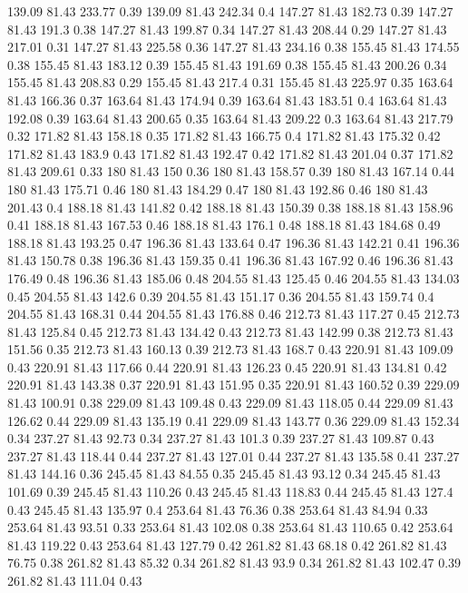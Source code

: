 139.09	81.43	233.77	0.39
139.09	81.43	242.34	0.4
147.27	81.43	182.73	0.39
147.27	81.43	191.3	0.38
147.27	81.43	199.87	0.34
147.27	81.43	208.44	0.29
147.27	81.43	217.01	0.31
147.27	81.43	225.58	0.36
147.27	81.43	234.16	0.38
155.45	81.43	174.55	0.38
155.45	81.43	183.12	0.39
155.45	81.43	191.69	0.38
155.45	81.43	200.26	0.34
155.45	81.43	208.83	0.29
155.45	81.43	217.4	0.31
155.45	81.43	225.97	0.35
163.64	81.43	166.36	0.37
163.64	81.43	174.94	0.39
163.64	81.43	183.51	0.4
163.64	81.43	192.08	0.39
163.64	81.43	200.65	0.35
163.64	81.43	209.22	0.3
163.64	81.43	217.79	0.32
171.82	81.43	158.18	0.35
171.82	81.43	166.75	0.4
171.82	81.43	175.32	0.42
171.82	81.43	183.9	0.43
171.82	81.43	192.47	0.42
171.82	81.43	201.04	0.37
171.82	81.43	209.61	0.33
180	81.43	150	0.36
180	81.43	158.57	0.39
180	81.43	167.14	0.44
180	81.43	175.71	0.46
180	81.43	184.29	0.47
180	81.43	192.86	0.46
180	81.43	201.43	0.4
188.18	81.43	141.82	0.42
188.18	81.43	150.39	0.38
188.18	81.43	158.96	0.41
188.18	81.43	167.53	0.46
188.18	81.43	176.1	0.48
188.18	81.43	184.68	0.49
188.18	81.43	193.25	0.47
196.36	81.43	133.64	0.47
196.36	81.43	142.21	0.41
196.36	81.43	150.78	0.38
196.36	81.43	159.35	0.41
196.36	81.43	167.92	0.46
196.36	81.43	176.49	0.48
196.36	81.43	185.06	0.48
204.55	81.43	125.45	0.46
204.55	81.43	134.03	0.45
204.55	81.43	142.6	0.39
204.55	81.43	151.17	0.36
204.55	81.43	159.74	0.4
204.55	81.43	168.31	0.44
204.55	81.43	176.88	0.46
212.73	81.43	117.27	0.45
212.73	81.43	125.84	0.45
212.73	81.43	134.42	0.43
212.73	81.43	142.99	0.38
212.73	81.43	151.56	0.35
212.73	81.43	160.13	0.39
212.73	81.43	168.7	0.43
220.91	81.43	109.09	0.43
220.91	81.43	117.66	0.44
220.91	81.43	126.23	0.45
220.91	81.43	134.81	0.42
220.91	81.43	143.38	0.37
220.91	81.43	151.95	0.35
220.91	81.43	160.52	0.39
229.09	81.43	100.91	0.38
229.09	81.43	109.48	0.43
229.09	81.43	118.05	0.44
229.09	81.43	126.62	0.44
229.09	81.43	135.19	0.41
229.09	81.43	143.77	0.36
229.09	81.43	152.34	0.34
237.27	81.43	92.73	0.34
237.27	81.43	101.3	0.39
237.27	81.43	109.87	0.43
237.27	81.43	118.44	0.44
237.27	81.43	127.01	0.44
237.27	81.43	135.58	0.41
237.27	81.43	144.16	0.36
245.45	81.43	84.55	0.35
245.45	81.43	93.12	0.34
245.45	81.43	101.69	0.39
245.45	81.43	110.26	0.43
245.45	81.43	118.83	0.44
245.45	81.43	127.4	0.43
245.45	81.43	135.97	0.4
253.64	81.43	76.36	0.38
253.64	81.43	84.94	0.33
253.64	81.43	93.51	0.33
253.64	81.43	102.08	0.38
253.64	81.43	110.65	0.42
253.64	81.43	119.22	0.43
253.64	81.43	127.79	0.42
261.82	81.43	68.18	0.42
261.82	81.43	76.75	0.38
261.82	81.43	85.32	0.34
261.82	81.43	93.9	0.34
261.82	81.43	102.47	0.39
261.82	81.43	111.04	0.43
